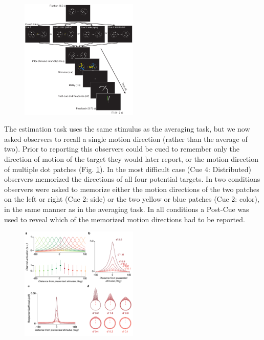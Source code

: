 \begin{figure}
\centering
\includegraphics[keepaspectratio,width=0.5\textwidth]{figs_c4/f4_estimationtask.pdf}
\caption[Estimation task]{}
\label{fig:c4f4}
\end{figure}

The estimation task uses the same stimulus as the averaging task, but we now asked observers to recall a single motion direction (rather than the average of two). Prior to reporting this observers could be cued to remember only the direction of motion of the target they would later report, or the motion direction of multiple dot patches (Fig. \ref{fig:c4f4}). In the most difficult case (Cue 4: Distributed) observers memorized the directions of all four potential targets. In two conditions observers were asked to memorize either the motion directions of the two patches on the left or right (Cue 2: side) or the two yellow or blue patches (Cue 2: color), in the same manner as in the averaging task. In all conditions a Post-Cue was used to reveal which of the memorized motion directions had to be reported.

\begin{figure}
\centering
\includegraphics[keepaspectratio,width=0.5\textwidth]{figs_c4/f3_TCC_model.pdf}
\caption[TCC model]{}
\label{fig:c4f5}
\end{figure}

